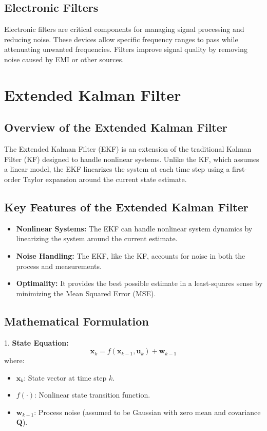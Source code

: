 \subsection {Electronic Filters}
Electronic filters are critical components for managing signal processing and reducing noise. These devices allow specific frequency ranges to pass while attenuating unwanted frequencies. Filters improve signal quality by removing noise caused by EMI or other sources.

\section {Extended Kalman Filter}

\subsection{Overview of the Extended Kalman Filter}

The Extended Kalman Filter (EKF) is an extension of the traditional Kalman Filter (KF) designed to handle nonlinear systems. Unlike the KF, which assumes a linear model, the EKF linearizes the system at each time step using a first-order Taylor expansion around the current state estimate.

\subsection {Key Features of the Extended Kalman Filter}
\begin{itemize}
	\item \textbf{Nonlinear Systems:} The EKF can handle nonlinear system dynamics by linearizing the system around the current estimate.
	\item \textbf{Noise Handling:} The EKF, like the KF, accounts for noise in both the process and measurements.
	\item \textbf{Optimality:} It provides the best possible estimate in a least-squares sense by minimizing the Mean Squared Error (MSE).
\end{itemize}

\subsection {Mathematical Formulation}

1. \textbf{State Equation:}
\[
\mathbf{x}_k = f(\mathbf{x}_{k-1}, \mathbf{u}_k) + \mathbf{w}_{k-1}
\]
where:
\begin{itemize}
	\item \( \mathbf{x}_k \): State vector at time step \( k \).
	\item \( f(\cdot) \): Nonlinear state transition function.
	\item \( \mathbf{w}_{k-1} \): Process noise (assumed to be Gaussian with zero mean and covariance \( \mathbf{Q} \)).
\end{itemize}


